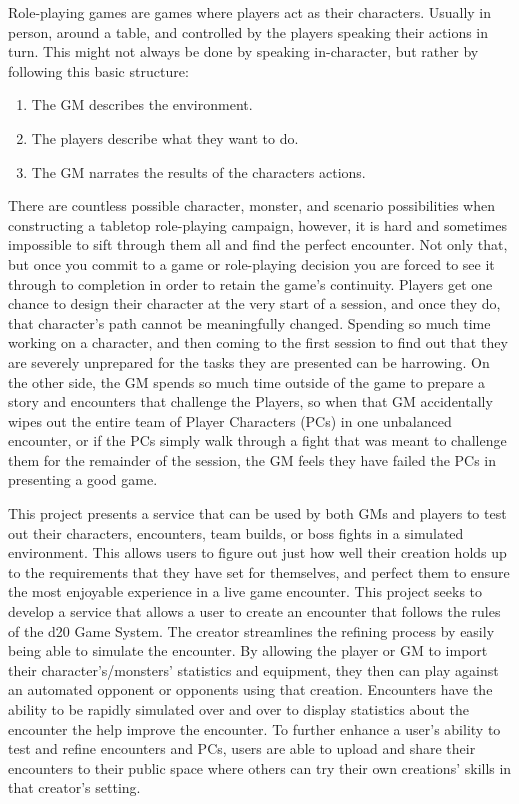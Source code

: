 \documentclass[letterpaper, 10 pt, conference]{ieeeconf}
\begin{document}
Role-playing games are games where players act as their characters. Usually
in person, around a table, and controlled by the players speaking their actions
in turn. This might not always be done by speaking in-character, but rather by
following this basic structure:
\begin{enumerate}
	\item The GM describes the environment.
	\item The players describe what they want to do.
	\item The GM narrates the results of the characters actions.
\end{enumerate}
\par
There are countless possible character, monster, and scenario possibilities when
constructing a tabletop role-playing campaign, however, it is hard and sometimes
impossible to sift through them all and find the perfect encounter. Not only that,
but once you commit to a game or role-playing decision you are forced to see it
through to completion in order to retain the game’s continuity. Players get one
chance to design their character at the very start of a session, and once they do,
that character’s path cannot be meaningfully changed. Spending so much time
working on a character, and then coming to the first session to find out that they
are severely unprepared for the tasks they are presented can be harrowing. On the
other side, the GM spends so much time outside of the game to prepare a story
and encounters that challenge the Players, so when that GM accidentally wipes
out the entire team of Player Characters (PCs) in one unbalanced encounter, or
if the PCs simply walk through a fight that was meant to challenge them for the
remainder of the session, the GM feels they have failed the PCs in presenting a
good game. \par
This project presents a service that can be used by both GMs and players to
test out their characters, encounters, team builds, or boss fights in a simulated
environment. This allows users to figure out just how well their creation holds
up to the requirements that they have set for themselves, and perfect them to
ensure the most enjoyable experience in a live game encounter.
This project seeks to develop a service that allows a user to create an encounter
that follows the rules of the d20 Game System. The creator streamlines the refining
process by easily being able to simulate the encounter. By allowing the player or
GM to import their character’s/monsters’ statistics and equipment, they then
can play against an automated opponent or opponents using that creation. Encounters have the ability to be rapidly simulated over and over to display
statistics about the encounter the help improve the encounter. To further enhance
a user’s ability to test and refine encounters and PCs, users are able to upload
and share their encounters to their public space where others can try their own
creations’ skills in that creator’s setting.
\end{document}
